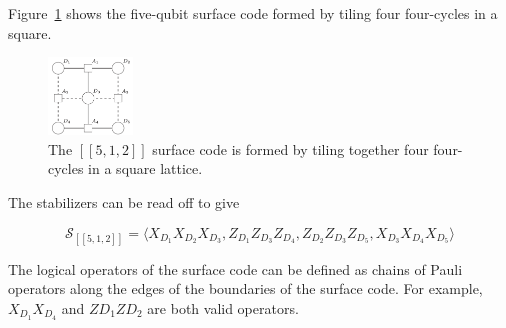 Figure~\ref{fig:512} shows the five-qubit surface code formed by tiling four four-cycles in a square.
\begin{figure}[h]
    \centering
    \includegraphics[width=0.2\textwidth]{sections/2_review_surface_code/512.png}
    \caption{The $[[5,1,2]]$ surface code is formed by tiling together four four-cycles in a square lattice.}
    \label{fig:512}
\end{figure}

The stabilizers can be read off to give

\[
\mathcal{S}_{[[5,1,2]]} = \langle X_{D_1}X_{D_2}X_{D_3}, Z_{D_1}Z_{D_3}Z_{D_4}, Z_{D_2}Z_{D_3}Z_{D_5}, X_{D_3}X_{D_4}X_{D_5} \rangle 
\]

The logical operators of the surface code can be defined as chains of Pauli operators along the edges of the boundaries of the surface code. For example, $X_{D_1}X_{D_4}$ and $Z{D_1}Z{D_2}$ are both valid operators.

